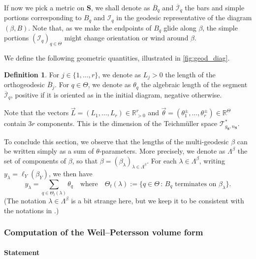 \documentclass[12pt,twoside]{article}
\theoremstyle{theorem}
\theoremstyle{remark}
\theoremstyle{definition}
\newtheorem{defi}[thm]{Definition}
\theoremstyle{example}
\newcommand{\R}{\mathbb{R}}
\newcommand{\1}[1]{\mathds{1}_{#1}}
\newcommand{\cT}{\mathcal{T}}
\newcommand{\Sf}{\mathbf{S}}
\newcommand{\g}{g_{\mathbf{S}}}
\newcommand{\n}{n_{\mathbf{S}}}
\newcommand{\cI}{\mathcal{I}}
\newcommand{\Lambdabeta}{\Lambda^\beta}
\begin{document}
If now we pick a metric on $\Sf$, we shall denote as $\overline{B}_q$ and $\overline{\cI}_q$ the
bars and simple portions corresponding to $B_q$ and $\cI_q$ in the geodesic representative of the
diagram $(\beta,B)$. Note that, as we make the endpoints of $B_q$ glide along $\beta$, the simple
portions $(\cI_q)_{q \in \Theta}$ might change orientation or wind around $\beta$.

We define the following geometric quantities, illustrated in \cref{fig:geod_diag}.

\begin{defi}
  For $j \in \{1, \ldots, r\}$, we denote as $L_j>0$ the length of the orthogeodesic
  $\overline{B}_j$.
  For $q \in \Theta$, we denote as $\theta_q$ the algebraic length of the segment
  $\overline{\cI}_q$, positive if it is oriented as in the initial diagram, negative otherwise.
\end{defi}

Note that the vectors $\vec{L} = (L_1, \ldots, L_r) \in \R_{>0}^r$ and $\vec{\theta} =
(\theta_1^\pm, \ldots, \theta_r^\pm) \in \R^\Theta$ contain $3r$ components. This is the dimension
of the Teichm\"uller space $\cT_{\g,\n}^*$. 

To conclude this section, we observe that the lengths of the multi-geodesic $\beta$ can be written
simply as a sum of $\theta$-parameters. More precisely, we denote as $\Lambdabeta$ the set of
components of $\beta$, so that $\beta = (\beta_\lambda)_{\lambda \in \Lambdabeta}$. For each
$\lambda \in \Lambdabeta$, writing $y_\lambda = \ell_Y(\beta_Y)$, we then have
\begin{equation}
  \label{eq:l_beta}
  y_\lambda
  = \sum_{q \in \Theta_t(\lambda)} \theta_q
  \quad \text{where} \quad
  \Theta_t(\lambda) := \{q \in \Theta \, : \, B_q \text{ terminates on } \beta_\lambda\}.
\end{equation}
(The notation $\lambda \in \Lambdabeta$ is a bit strange here, but we keep it to be consistent with
the notations in \cite{anantharaman2025}.)

\subsubsection{Computation of the Weil--Petersson volume form}
\label{sec:comp-weil-peterss}

\paragraph{Statement}
\end{document}
